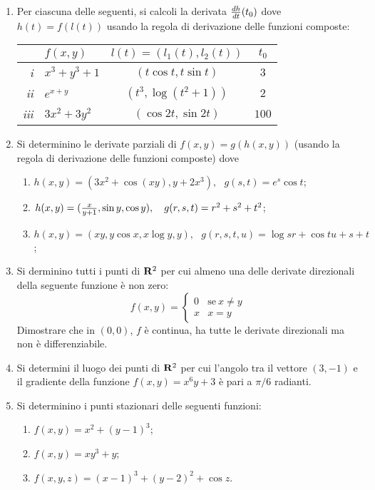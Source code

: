 \begin{enumerate}
\begin{center}
\begin{tabular}{|r|l|c|c|c|c|}
\hline
\end{tabular}
\end{center}
\item Per ciascuna delle seguenti, si calcoli la derivata 
${d h\over d t}(t_0)$ dove $h(t)=f(l(t))$ usando la regola di derivazione
delle funzioni composte:
\begin{center}
\begin{tabular}{|r|l|c|c|}
\hline
& $f(x,y)$ & $l(t)=(l_1(t),l_2(t))$ & $t_0$\\
\hline
\hline
{\it i} & $x^3+y^3+1$ & $(t\cos t,t\sin t)$ & $3$\\
\hline
{\it ii} &$e^{x+y}$ & $(t^3,\log(t^2+1))$ & $2$\\
\hline
{\it iii} &$3x^2+3y^2$ & $(\cos 2t,\sin 2t)$ & $100$\\
\hline
\end{tabular}
\end{center}
\item Si determinino le derivate parziali di $f(x,y)=g(h(x,y))$ (usando la regola di 
derivazione delle funzioni composte) dove
\begin{enumerate}
\item $h(x,y)=(3x^2+\cos(xy), y+2x^3),\ \ \ g(s,t)=e^s\cos t$;
\item $h(x,y)=({x\over y+1}, \sin y, \cos y),\ \ \ g(r,s,t)=r^2+s^2+t^2$;
\item $h(x,y)=(xy,y\cos x,x\log y,y),\ \ \ g(r,s,t,u)=\log sr+\cos tu+s+t$;
\end{enumerate}
\item Si derminino tutti i punti di ${\bf R}^2$ per cui almeno una delle derivate 
direzionali della seguente funzione \`e non zero:
$$f(x,y)=\left\{\begin{array}{ll} 0 & \mbox{se}\ x\neq y \\ x & x=y \end{array} \right.$$
Dimostrare che in $(0,0)$, $f$ \`e continua, ha tutte le derivate direzionali ma non \`e 
differenziabile.
\item Si determini il luogo dei punti di ${\bf R}^2$ per cui l'angolo tra il vettore 
$(3,-1)$ e il gradiente della funzione $f(x,y)=x^6y+3$ \`e pari a $\pi/6$ radianti.
\item Si determinino i punti stazionari delle seguenti funzioni:
\begin{enumerate}
\item $f(x,y)=x^2+(y-1)^3$;
\item $f(x,y)=xy^3+y$;
\item $f(x,y,z)=(x-1)^3+(y-2)^2+\cos  z$.

\end{enumerate}
\end{enumerate}
